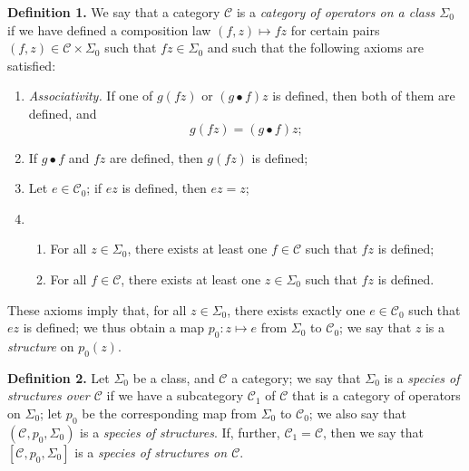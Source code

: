 \documentclass[a4paper,oneside,nobib,nofonts,notitlepage,notoc,nols,fleqn,justified]{tufte-book}
\newenvironment{rmenv}[1]
  {\phantomsection\par\medskip\noindent\textbf{#1.}\rmfamily}
  {\par\medskip}
\newcommand{\CC}{\mathcal{C}}
\begin{document}
\begin{rmenv}{Definition 1}
\label{definition:1}
  We say that a category $\CC$ is a \emph{category of operators on a class $\Sigma_0$} if we have defined a composition law $(f,z)\mapsto fz$ for certain pairs $(f,z)\in\CC\times\Sigma_0$ such that $fz\in\Sigma_0$ and such that the following axioms are satisfied:
  \begin{enumerate}
    \item[\normalfont(1)]
      \emph{Associativity.}
      If one of $g(fz)$ or $(g\bullet f)z$ is defined, then both of them are defined, and
      \[
        g(fz)
        = (g\bullet f)z;
      \]
    \item[\normalfont(2)]
      If $g\bullet f$ and $fz$ are defined, then $g(fz)$ is defined;
    \item[\normalfont(3)]
      Let $e\in\CC_0$;
      if $ez$ is defined, then $ez=z$;
    \item[\normalfont(4)]
      \begin{enumerate}
        \item[(a)]
          For all $z\in\Sigma_0$, there exists at least one $f\in\CC$ such that $fz$ is defined;
        \item[(b)]
          For all $f\in\CC$, there exists at least one $z\in\Sigma_0$ such that $fz$ is defined.
      \end{enumerate}
  \end{enumerate}
\end{rmenv}

These axioms imply that, for all $z\in\Sigma_0$, there exists exactly one $e\in\CC_0$ such that $ez$ is defined;
we thus obtain a map $p_0\colon z\mapsto e$ from $\Sigma_0$ to $\CC_0$;
we say that $z$ is a \emph{structure} on $p_0(z)$.

\begin{rmenv}{Definition 2}
\label{definition:2}
  Let $\Sigma_0$ be a class, and $\CC$ a category;
  we say that $\Sigma_0$ is a \emph{species of structures over $\CC$} if we have a subcategory $\CC_1$ of $\CC$ that is a category of operators on $\Sigma_0$;
  let $p_0$ be the corresponding map from $\Sigma_0$ to $\CC_0$;
  we also say that $(\CC,p_0,\Sigma_0)$ is a \emph{species of structures}.
  If, further, $\CC_1=\CC$, then we say that $[\CC,p_0,\Sigma_0]$ is a \emph{species of structures on $\CC$}.
\end{rmenv}
\end{document}
